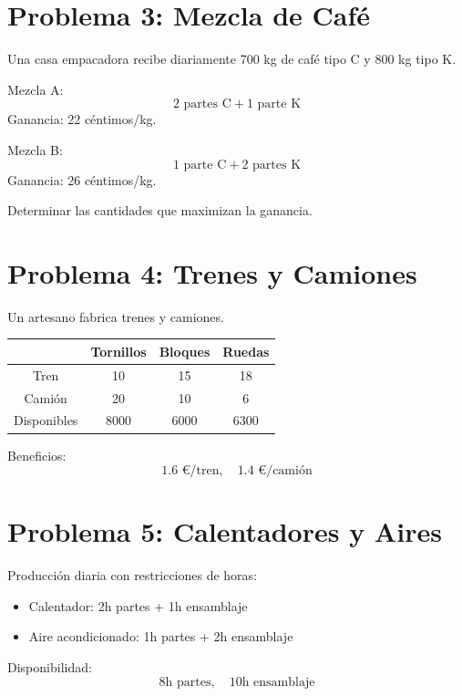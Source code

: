 \documentclass[12pt]{article}
\begin{document}
\section*{Problema 3: Mezcla de Café}

Una casa empacadora recibe diariamente 700 kg de café tipo C y 800 kg tipo K.

Mezcla A:
\[
2 \text{ partes C} + 1 \text{ parte K}
\]
Ganancia: 22 céntimos/kg.

Mezcla B:
\[
1 \text{ parte C} + 2 \text{ partes K}
\]
Ganancia: 26 céntimos/kg.

Determinar las cantidades que maximizan la ganancia.

\section*{Problema 4: Trenes y Camiones}

Un artesano fabrica trenes y camiones.

\begin{center}
\begin{tabular}{c|ccc}
\toprule
 & Tornillos & Bloques & Ruedas \\
\midrule
Tren & 10 & 15 & 18 \\
Camión & 20 & 10 & 6 \\
\midrule
Disponibles & 8000 & 6000 & 6300 \\
\bottomrule
\end{tabular}
\end{center}

Beneficios:
\[
1.6 \text{ €/tren}, \quad 1.4 \text{ €/camión}
\]

\section*{Problema 5: Calentadores y Aires}

Producción diaria con restricciones de horas:

\begin{itemize}
\item Calentador: 2h partes + 1h ensamblaje
\item Aire acondicionado: 1h partes + 2h ensamblaje
\end{itemize}

Disponibilidad:
\[
8 \text{h partes}, \quad 10 \text{h ensamblaje}
\]
\end{document}

